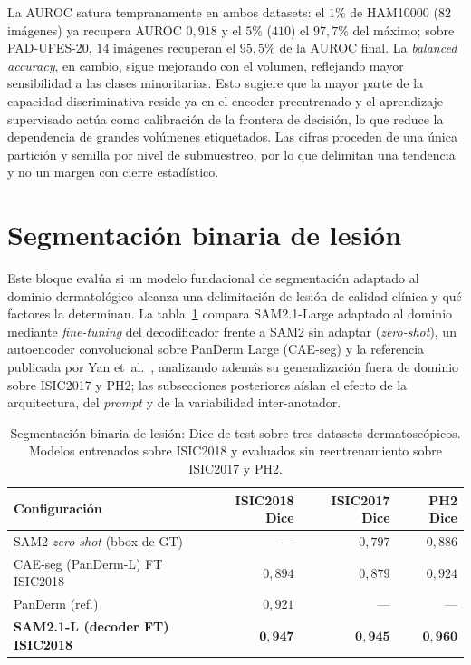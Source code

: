 La AUROC satura tempranamente en ambos datasets: el $1\%$ de HAM10000
($82$ imágenes) ya recupera AUROC $0{,}918$ y el $5\%$ ($410$) el
$97{,}7\%$ del máximo; sobre PAD-UFES-20, $14$ imágenes recuperan el
$95{,}5\%$ de la AUROC final. La \emph{balanced accuracy}, en cambio,
sigue mejorando con el volumen, reflejando mayor sensibilidad a las
clases minoritarias. Esto sugiere que la mayor parte de la capacidad
discriminativa reside ya en el encoder preentrenado y el aprendizaje
supervisado actúa como calibración de la frontera de decisión, lo que
reduce la dependencia de grandes volúmenes etiquetados. Las cifras
proceden de una única partición y semilla por nivel de submuestreo, por
lo que delimitan una tendencia y no un margen con cierre estadístico.

\section{Segmentación binaria de lesión}
\label{sec:seg-results}

Este bloque evalúa si un modelo fundacional de segmentación adaptado
al dominio dermatológico alcanza una delimitación de lesión de calidad
clínica y qué factores la determinan. La tabla~\ref{tab:seg} compara
SAM2.1-Large adaptado al dominio mediante \emph{fine-tuning} del
decodificador frente a SAM2 sin adaptar (\emph{zero-shot}), un
autoencoder convolucional sobre PanDerm Large (CAE-seg) y la
referencia publicada por Yan et~al.~\cite{panderm2025}, analizando
además su generalización fuera de dominio sobre ISIC2017 y PH2; las
subsecciones posteriores aíslan el efecto de la arquitectura, del
\emph{prompt} y de la variabilidad inter-anotador.

\begin{table}[htbp]
\centering
\footnotesize
\setlength{\tabcolsep}{4pt}
\renewcommand{\arraystretch}{0.95}
\caption{Segmentación binaria de lesión: Dice de test sobre tres
datasets dermatoscópicos. Modelos entrenados sobre ISIC2018 y
evaluados sin reentrenamiento sobre ISIC2017 y PH2.}
\label{tab:seg}
\begin{tabular}{lrrr}
\hline
Configuración                         & ISIC2018 Dice & ISIC2017 Dice & PH2 Dice \\
\hline
SAM2 \emph{zero-shot} (bbox de GT)    & ---           & $0{,}797$     & $0{,}886$ \\
CAE-seg (PanDerm-L) FT ISIC2018       & $0{,}894$     & $0{,}879$     & $0{,}924$ \\
PanDerm \cite{panderm2025} (ref.)     & $0{,}921$     & ---           & --- \\
\textbf{SAM2.1-L (decoder FT) ISIC2018}  & $\mathbf{0{,}947}$ & $\mathbf{0{,}945}$ & $\mathbf{0{,}960}$ \\
\hline
\end{tabular}
\end{table}


